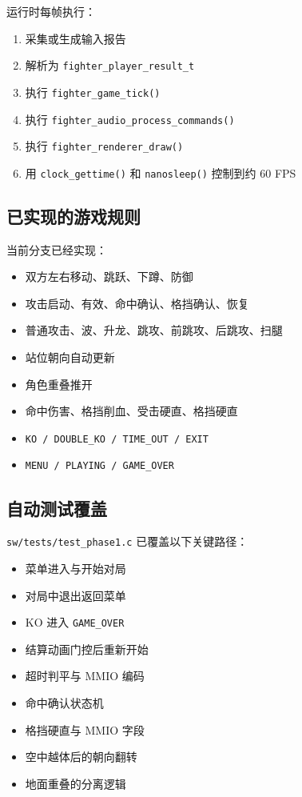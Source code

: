 \documentclass[12pt,a4paper]{ctexart}
\begin{document}
运行时每帧执行：

\begin{enumerate}
  \item 采集或生成输入报告
  \item 解析为 \texttt{fighter\_player\_result\_t}
  \item 执行 \texttt{fighter\_game\_tick()}
  \item 执行 \texttt{fighter\_audio\_process\_commands()}
  \item 执行 \texttt{fighter\_renderer\_draw()}
  \item 用 \texttt{clock\_gettime()} 和 \texttt{nanosleep()} 控制到约 60 FPS
\end{enumerate}

\subsection{已实现的游戏规则}

当前分支已经实现：

\begin{itemize}
  \item 双方左右移动、跳跃、下蹲、防御
  \item 攻击启动、有效、命中确认、格挡确认、恢复
  \item 普通攻击、波、升龙、跳攻、前跳攻、后跳攻、扫腿
  \item 站位朝向自动更新
  \item 角色重叠推开
  \item 命中伤害、格挡削血、受击硬直、格挡硬直
  \item \texttt{KO / DOUBLE\_KO / TIME\_OUT / EXIT}
  \item \texttt{MENU / PLAYING / GAME\_OVER}
\end{itemize}

\subsection{自动测试覆盖}

\texttt{sw/tests/test\_phase1.c} 已覆盖以下关键路径：

\begin{itemize}
  \item 菜单进入与开始对局
  \item 对局中退出返回菜单
  \item KO 进入 \texttt{GAME\_OVER}
  \item 结算动画门控后重新开始
  \item 超时判平与 MMIO 编码
  \item 命中确认状态机
  \item 格挡硬直与 MMIO 字段
  \item 空中越体后的朝向翻转
  \item 地面重叠的分离逻辑
\end{itemize}
\end{document}
